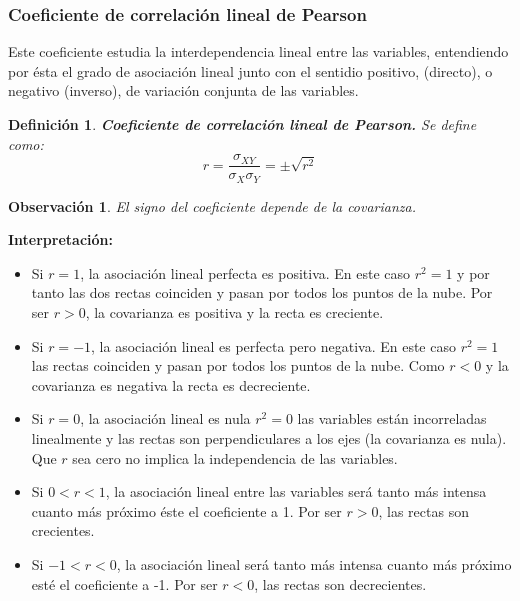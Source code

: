 \documentclass[10pt, a4paper]{article}
\theoremstyle{theorem-style}
\theoremstyle{definition-style}
\newtheorem{ndef}{Definición}[section]
\theoremstyle{remark-style}
\newtheorem*{nota}{Observación}
\theoremstyle{example-style}
\theoremstyle{definition-style}
\theoremstyle{remark-style}
\begin{document}
\pagebreak

\subsubsection{Coeficiente de correlación lineal de Pearson}

Este coeficiente estudia la interdependencia lineal entre las variables,
entendiendo por ésta el grado de asociación lineal junto con el sentidio
positivo, (directo), o negativo (inverso), de variación conjunta de las
variables.

\begin{ndef}
	\textbf{Coeficiente de correlación lineal de Pearson.}
	Se define como:$$ r = \frac{\sigma_{XY}}{\sigma_{X} \sigma_{Y}}  = \pm \sqrt{r^2}$$
\end{ndef}

\begin{nota}
	El signo del coeficiente depende de la covarianza.
\end{nota}


\textbf{Interpretación:}

\begin{itemize}

\item Si $r = 1$, la asociación lineal perfecta es positiva. En este caso $r^2 = 1$ y
por tanto las dos rectas coinciden y pasan por todos los puntos de la nube. Por
ser $r > 0$, la covarianza es positiva y la recta es creciente.

\item Si $r= -1$, la asociación lineal es perfecta pero negativa. En este caso $r^2 =
1$ las rectas coinciden y pasan por todos los puntos de la nube. Como $r < 0$ y
la covarianza es negativa la recta es decreciente.

\item Si $r = 0$, la asociación lineal es nula $r^2 = 0$ las variables están
incorreladas linealmente y las rectas son perpendiculares a los ejes (la
covarianza es nula).  Que $r$ sea cero no implica la independencia de las
variables.

\item Si $ 0 < r < 1 $, la asociación lineal entre las variables será tanto más intensa
cuanto más próximo éste el coeficiente a 1. Por ser $ r > 0 $, las rectas son
crecientes.

\item Si $ -1 < r < 0 $, la asociación lineal será tanto más intensa cuanto más próximo
esté el coeficiente a -1. Por ser $ r < 0$, las rectas son decrecientes.

\end{itemize}
\end{document}
